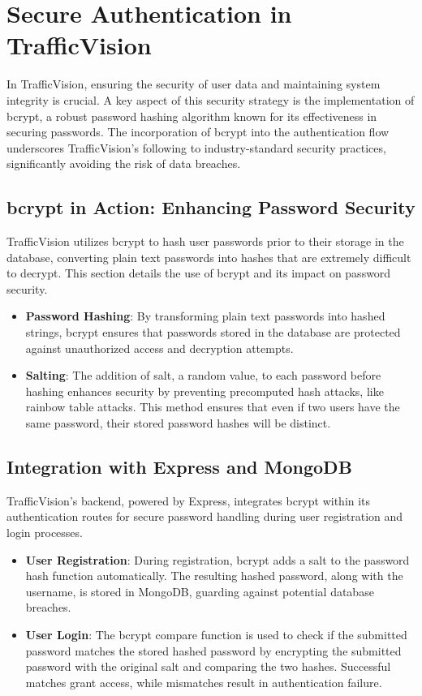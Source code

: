 \section{Secure Authentication in TrafficVision}
In TrafficVision, ensuring the security of user data and maintaining system integrity is crucial. A key aspect of this security strategy is the implementation of bcrypt, a robust password hashing algorithm known for its effectiveness in securing passwords. The incorporation of bcrypt into the authentication flow underscores TrafficVision's following to industry-standard security practices, significantly avoiding the risk of data breaches.

\subsection{bcrypt in Action: Enhancing Password Security}
TrafficVision utilizes bcrypt to hash user passwords prior to their storage in the database, converting plain text passwords into hashes that are extremely difficult to decrypt. This section details the use of bcrypt and its impact on password security.

\begin{itemize}
    \item \textbf{Password Hashing}: By transforming plain text passwords into hashed strings, bcrypt ensures that passwords stored in the database are protected against unauthorized access and decryption attempts.
    
    \item \textbf{Salting}: The addition of salt, a random value, to each password before hashing enhances security by preventing precomputed hash attacks, like rainbow table attacks. This method ensures that even if two users have the same password, their stored password hashes will be distinct.
\end{itemize}

\subsection{Integration with Express and MongoDB}
TrafficVision's backend, powered by Express, integrates bcrypt within its authentication routes for secure password handling during user registration and login processes.

\begin{itemize}
    \item \textbf{User Registration}: During registration, bcrypt adds a salt to the password hash function automatically. The resulting hashed password, along with the username, is stored in MongoDB, guarding against potential database breaches.
    
    \item \textbf{User Login}: The bcrypt compare function is used to check if the submitted password matches the stored hashed password by encrypting the submitted password with the original salt and comparing the two hashes. Successful matches grant access, while mismatches result in authentication failure.
\end{itemize}

